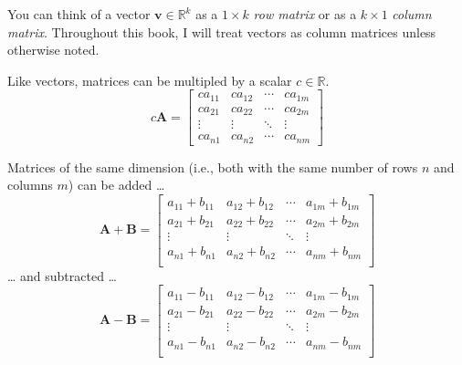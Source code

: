 \documentclass[
  12pt,
  oneside,openany]{book}
\begin{document}
You can think of a vector \(\mathbf{v} \in \mathbb{R}^k\) as a \(1 \times k\) \emph{row matrix} or as a \(k \times 1\) \emph{column matrix}. Throughout this book, I will treat vectors as column matrices unless otherwise noted.

Like vectors, matrices can be multipled by a scalar \(c \in \mathbb{R}\).
\[
c \mathbf{A} =
\begin{bmatrix}
  c a_{11} & c a_{12} & \cdots & c a_{1m} \\
  c a_{21} & c a_{22} & \cdots & c a_{2m} \\
  \vdots & \vdots & \ddots & \vdots \\
  c a_{n1} & c a_{n2} & \cdots & c a_{nm}
\end{bmatrix}
\]

Matrices of the same dimension (i.e., both with the same number of rows \(n\) and columns \(m\)) can be added \ldots{}
\[
\mathbf{A} + \mathbf{B} =
\begin{bmatrix}
  a_{11} + b_{11} & a_{12} + b_{12} & \cdots & a_{1m} + b_{1m} \\
  a_{21} + b_{21} & a_{22} + b_{22} & \cdots & a_{2m} + b_{2m} \\
  \vdots & \vdots & \ddots & \vdots \\
  a_{n1} + b_{n1} & a_{n2} + b_{n2} & \cdots & a_{nm} + b_{nm} \\
\end{bmatrix}
\]
\ldots{} and subtracted \ldots{}
\[
\mathbf{A} - \mathbf{B} =
\begin{bmatrix}
  a_{11} - b_{11} & a_{12} - b_{12} & \cdots & a_{1m} - b_{1m} \\
  a_{21} - b_{21} & a_{22} - b_{22} & \cdots & a_{2m} - b_{2m} \\
  \vdots & \vdots & \ddots & \vdots \\
  a_{n1} - b_{n1} & a_{n2} - b_{n2} & \cdots & a_{nm} - b_{nm} \\
\end{bmatrix}
\]
\end{document}
